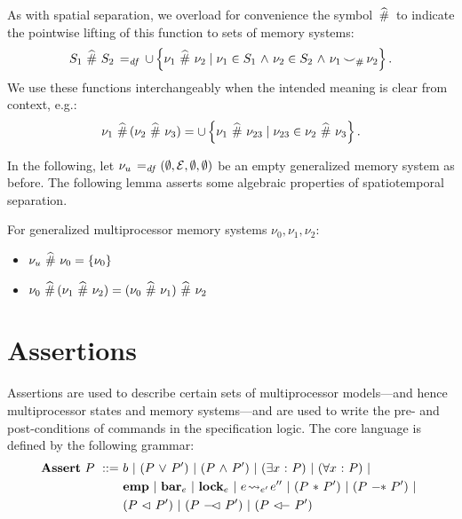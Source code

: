 \documentclass[11pt]{report}
\begin{document}
As with spatial separation, we overload for convenience the symbol $\operatorname{\,\widehat{\#}\,}$ to indicate the pointwise lifting of this function to sets of memory systems: \[ S_1 \operatorname{\,\widehat{\#}\,} S_2 \operatorname{\;=_{\mathit{df}}\;} \cup \left\lbrace \nu_1 \operatorname{\,\widehat{\#}\,} \nu_2 \mid \nu_1 \in S_1 \operatorname{\,\wedge\,} \nu_2 \in S_2 \operatorname{\,\wedge\,} \nu_1 \operatorname{\smile}_\# \nu_2 \right\rbrace.\] We use these functions interchangeably when the intended meaning is clear from context, e.g.: \[ \nu_1 \operatorname{\,\widehat{\#}\,} (\nu_2 \operatorname{\,\widehat{\#}\,} \nu_3) = \cup \left\lbrace \nu_1 \operatorname{\,\widehat{\#}\,} \nu_{23} \mid \nu_{23} \in \nu_2 \operatorname{\,\widehat{\#}\,} \nu_3 \right\rbrace.\] 

In the following, let $\nu_u \operatorname{\;=_{\mathit{df}}\;} (\operatorname{\emptyset}, \mathcal{E}, \operatorname{\emptyset}, \operatorname{\emptyset})$ be an empty generalized memory system as before. The following lemma asserts some algebraic properties of spatiotemporal separation. \begin{lemma}
  \label{lem:spatiotemporal-separation-algebra}
  For generalized multiprocessor memory systems $\nu_0, \nu_1, \nu_2$: 
  \begin{itemize}
    \item $\nu_u \operatorname{\,\widehat{\#}\,} \nu_0 = \left\lbrace \nu_0 \right\rbrace$
    \item $\nu_0 \operatorname{\,\widehat{\#}\,} (\nu_1 \operatorname{\,\widehat{\#}\,} \nu_2) = (\nu_0 \operatorname{\,\widehat{\#}\,} \nu_1) \operatorname{\,\widehat{\#}\,} \nu_2$
  \end{itemize}
\end{lemma}

\section{Assertions}
\label{sec:assertions}
\label{sec:multiprocessor-assertions}

Assertions are used to describe certain sets of multiprocessor models---and hence multiprocessor states and memory systems---and are used to write the pre- and post-conditions of commands in the specification logic. The core language is defined by the following grammar: \begin{align*}
	\asserts~P \bnfdef & b \bnfbar (P \disj P') \bnfbar (P \conj P') \bnfbar (\exists x \st P) \bnfbar (\forall x \st P) \bnfbar \\
	& \femp \bnfbar \fbar{e} \bnfbar \flock{e} \bnfbar e \fwrite{e'} e'' \bnfbar (P \fsep P') \bnfbar (P \fsepi P')  \bnfbar \\ 
	&  (P \fseq P') \bnfbar (P \fseqli P') \bnfbar (P \fseqri P')
\end{align*} 
\end{document}
